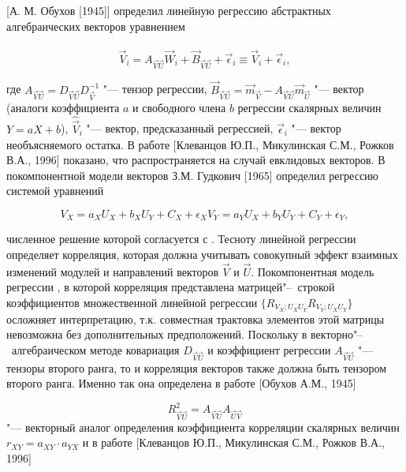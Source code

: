 [А. М. Обухов [1945]] определил линейную регрессию абстрактных алгебраических векторов уравнением

\begin{equation}
\label{eq:equation3_21}
{\vec{V}_{i}=A_{\vec{V}\vec{U}}\vec{W}_{i}+\vec{B}_{\vec{V}\vec{U}}+\vec{\epsilon}_{i}\equiv\hat{\vec{V}}_{i}+\vec{\epsilon}_{i}},
\end{equation} 

где $A_{\vec{V}\vec{U}}=D_{\vec{V}\vec{U}}D^{-1}_{\vec{V}}$ "--- тензор регрессии, $\vec{B}_{\vec{V}\vec{U}}=\vec{m}_{\vec{V}}-A_{\vec{V}\vec{U}}\vec{m}_{\vec{U}}$ "--- вектор (аналоги коэффициента $a$ и свободного члена $b$ регрессии скалярных величин $Y=aX+b$), $\hat{\vec{V}}_{i}$ "--- вектор, предсказанный регрессией, $\vec{\epsilon}_{i}$ "--- вектор необъясняемого остатка. В работе [Клеванцов Ю.П., Микулинская С.М., Рожков В.А., 1996] показано, что  распространяется на случай евклидовых векторов. 
В покомпонентной модели векторов З.М. Гудкович [1965] определил регрессию системой уравнений

\begin{equation}
\label{eq:equation3_22}
{V_{X}=a_{X}U_{X}+b_{X}U_{Y}+C_{X}+\epsilon_{X}}
{V_{Y}=a_{Y}U_{X}+b_{Y}U_{Y}+C_{Y}+\epsilon_{Y}},
\end{equation}

численное решение которой согласуется с .
Тесноту линейной регрессии  определяет корреляция, которая должна учитывать совокупный эффект взаимных изменений модулей и направлений векторов $\vec{V}$ и $\vec{U}$. Покомпонентная модель регрессии , в которой корреляция представлена матрицей"--~строкой коэффициентов множественной линейной регрессии $\{R_{V_{X};U_{X}U_{Y}}  R_{V_{Y};U_{X}U_{Y}}\}$ осложняет интерпретацию, т.к. совместная трактовка элементов этой матрицы невозможна без дополнительных предположений. Поскольку в векторно"--~алгебраическом методе ковариация $D_{\vec{V}\vec{U}}$  и коэффициент регрессии $A_{\vec{V}\vec{U}}$  "--- тензоры второго ранга, то и корреляция векторов также должна быть тензором второго ранга. Именно так она определена в работе [Обухов А.М., 1945]  

\begin{equation}
\label{eq:equation3_23}
{R^{2}_{\vec{V}\vec{U}}=A_{\vec{V}\vec{U}}A_{\vec{U}\vec{V}}}
\end{equation}  
"--- векторный аналог определения коэффициента корреляции скалярных величин $r_{XY}=a_{XY}\cdot a_{YX}$  и в работе [Клеванцов Ю.П., Микулинская С.М., Рожков В.А., 1996]
 
